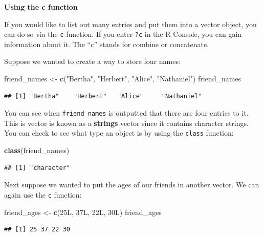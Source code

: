 \documentclass[]{tufte-book}
\newenvironment{Shaded}{\begin{snugshade}}{\end{snugshade}}
\newcommand{\KeywordTok}[1]{\textcolor[rgb]{0.13,0.29,0.53}{\textbf{{#1}}}}
\newcommand{\StringTok}[1]{\textcolor[rgb]{0.31,0.60,0.02}{{#1}}}
\newcommand{\NormalTok}[1]{{#1}}
\begin{document}
\noindent\textbf{Using the c function}\vspace*{0.1in}

If you would like to list out many entries and put them into a vector
object, you can do so via the \texttt{c} function. If you enter
\texttt{?c} in the R Console, you can gain information about it. The
``c'' stands for combine or concatenate.

Suppose we wanted to create a way to store four names:

\begin{Shaded}
\begin{Highlighting}[]
\NormalTok{friend_names <-}\StringTok{ }\KeywordTok{c}\NormalTok{(}\StringTok{"Bertha"}\NormalTok{, }\StringTok{"Herbert"}\NormalTok{, }\StringTok{"Alice"}\NormalTok{, }\StringTok{"Nathaniel"}\NormalTok{)}
\NormalTok{friend_names}
\end{Highlighting}
\end{Shaded}

\begin{verbatim}
## [1] "Bertha"    "Herbert"   "Alice"     "Nathaniel"
\end{verbatim}

You can see when \texttt{friend\_names} is outputted that there are four
entries to it. This is vector is known as a \textbf{strings} vector
since it contains character strings. You can check to see what type an
object is by using the \texttt{class} function:

\begin{Shaded}
\begin{Highlighting}[]
\KeywordTok{class}\NormalTok{(friend_names)}
\end{Highlighting}
\end{Shaded}

\begin{verbatim}
## [1] "character"
\end{verbatim}

Next suppose we wanted to put the ages of our friends in another vector.
We can again use the \texttt{c} function:

\begin{Shaded}
\begin{Highlighting}[]
\NormalTok{friend_ages <-}\StringTok{ }\KeywordTok{c}\NormalTok{(25L, 37L, 22L, 30L)}
\NormalTok{friend_ages}
\end{Highlighting}
\end{Shaded}

\begin{verbatim}
## [1] 25 37 22 30
\end{verbatim}
\end{document}
